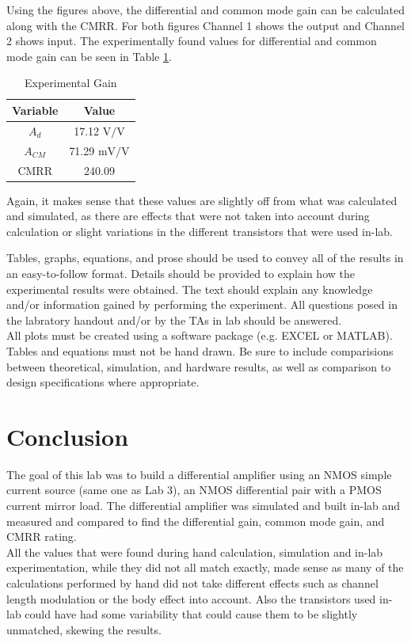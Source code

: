 \documentclass[11pt]{article}
\begin{document}
	Using the figures above, the differential and common mode gain can be 
	calculated along with the CMRR. For both figures Channel 1 shows the 
	output and Channel 2 shows input. The experimentally found values for 
	differential and common mode gain can be seen in Table 
	\ref{table:exp_gain}.

	\begin{table}[H]
		\centering
		\caption{Experimental Gain}
		\label{table:exp_gain}
		\begin{tabular}{|c|c|}
			\hline
			\textbf{Variable} & \textbf{Value}\\
			\hline
			$A_d$ & 17.12 $\si\volt/\si\volt$\\
			$A_{CM}$ & 71.29 $\si{\milli\volt}/\si\volt$\\
			CMRR & 240.09\\
			\hline
		\end{tabular}
	\end{table}
	
	Again, it makes sense that these values are slightly off from what was
	calculated and simulated, as there are effects that were not taken into 
	account during calculation or slight variations in the different transistors
	that were used in-lab. 

	Tables, graphs, equations, and prose should be used to convey all of the
	results in an easy-to-follow format. Details should be provided to 
	explain how the experimental results were obtained. The text should 
	explain any knowledge and/or information gained by performing the experiment.
	All questions posed in the labratory handout and/or by the TAs in lab should
	be answered.\\
	\hfill \break
	All plots must be created using a software package (e.g. EXCEL or MATLAB).
	Tables and equations must not be hand drawn. Be sure to include comparisions
	between theoretical, simulation, and hardware results, as well as
	comparison to design specifications where appropriate.

	\section{Conclusion}

	The goal of this lab was to build a differential amplifier using an NMOS
	simple current source (same one as Lab 3), an NMOS differential pair with
	a PMOS current mirror load. The differential amplifier was simulated and
	built in-lab and measured and compared to find the differential gain,
	common mode gain, and CMRR rating. \\
	\hfill \break
	All the values that were found during hand calculation, simulation and 
	in-lab experimentation, while they did not all match exactly, made sense
	as many of the calculations performed by hand did not take different effects
	such as channel length modulation or the body effect into account. Also
	the transistors used in-lab could have had some variability that could 
	cause them to be slightly unmatched, skewing the results.
\end{document}
